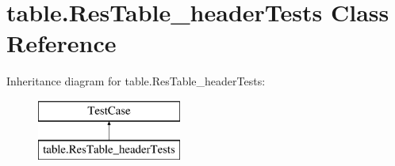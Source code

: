 \hypertarget{classtable_1_1ResTable__headerTests}{}\section{table.\+Res\+Table\+\_\+header\+Tests Class Reference}
\label{classtable_1_1ResTable__headerTests}
Inheritance diagram for table.\+Res\+Table\+\_\+header\+Tests\+:\begin{figure}[H]
\begin{center}
\leavevmode
\includegraphics[height=2.000000cm]{classtable_1_1ResTable__headerTests}
\end{center}
\end{figure}
